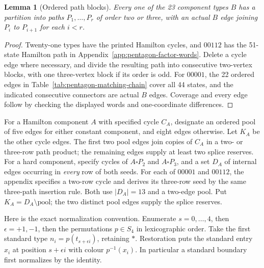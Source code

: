 \documentclass[11pt]{article}
\newtheorem{lemma}[theorem]{Lemma}
\theoremstyle{remark}
\numberwithin{equation}{section}
\numberwithin{table}{section}
\begin{document}
\begin{lemma}[Ordered path blocks]\label{lem:pentagon-path-blocks}
Every one of the 23 component types $B$ has a partition into paths
$P_1,\ldots,P_r$ of order two or three, with an actual $B$ edge
joining $P_i$ to $P_{i+1}$ for each $i<r$.
\end{lemma}
\begin{proof}
Twenty-one types have the printed Hamilton cycles, and $00112$ has
the 51-state Hamilton path in Appendix~\ref{app:pentagon-factor-words}.
Delete a cycle edge where necessary, and divide the resulting path
into consecutive two-vertex blocks, with one three-vertex block if
its order is odd. For $00001$, the 22 ordered edges in
Table~\ref{tab:pentagon-matching-chain} cover all 44 states, and the
indicated consecutive connectors are actual $B$ edges. Coverage and
every edge follow by checking the displayed words and one-coordinate
differences.
\end{proof}

For a Hamilton component $A$ with specified cycle $C_A$, designate an
ordered pool of five edges for either constant component, and eight
edges otherwise. Let $K_A$ be the other cycle edges. The first two
pool edges join copies of $C_A$ in a two- or three-row path product;
the remaining edges supply at least two splice reserves.
For a hard component, specify cycles of $A\square P_2$ and
$A\square P_3$, and a set $D_A$ of internal edges occurring in
\emph{every} row of both seeds. For each of $00001$ and $00112$,
the appendix specifies a two-row cycle and derives its three-row
seed by the same three-path insertion rule. Both use $|D_A|=13$
and a two-edge pool. Put $K_A=D_A\setminus\text{pool}$; the two
distinct pool edges supply the splice reserves.

Here is the exact normalization convention. Enumerate $s=0,\ldots,4$,
then $\epsilon=+1,-1$, then the permutations $p\in S_4$ in lexicographic
order. Take the first standard type
$n_i=p(t_{s+\epsilon i})$, retaining $\ast$. Restoration puts the
standard entry $x_i$ at position $s+\epsilon i$ with colour $p^{-1}(x_i)$.
In particular a standard boundary first normalizes by the identity.
\end{document}
